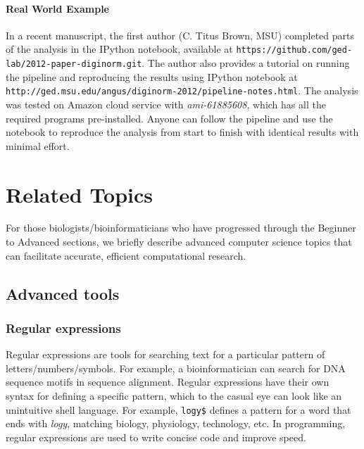 \documentclass[ChapterTOCs,krantz2]{krantz} %
\begin{document}
\paragraph{Real World Example}

In a recent manuscript, the first author (C. Titus Brown, MSU) completed parts
of the analysis in the IPython notebook, available at
\texttt{https://github.com/ged-lab/2012-paper-diginorm.git}. The author also
provides a tutorial on running the pipeline and reproducing the
results using IPython notebook at
\texttt{http://ged.msu.edu/angus/diginorm-2012/pipeline-notes.html}. 
The analysis was tested on Amazon cloud service with
\emph{ami-61885608}, which has all the required programs pre-installed. Anyone
can follow the pipeline and use the notebook to reproduce the
analysis from start to finish with identical results with minimal effort.

\section{Related Topics}

For those biologists/bioinformaticians who have progressed through the Beginner
to Advanced sections, we briefly describe advanced computer science topics 
that can facilitate accurate, efficient computational research.

\subsection{Advanced tools}




\subsubsection{Regular expressions}

Regular expressions are tools for
searching text for a particular pattern of letters/numbers/symbols.  For
example, a bioinformatician can search for DNA sequence motifs in sequence 
alignment.  Regular expressions have their own
syntax for defining a specific pattern, which to the casual eye can look like
an unintuitive shell language. For example, \texttt{logy\$} defines a pattern for a word
that ends with \emph{logy}, matching biology, physiology, technology, etc.
In programming, regular expressions are
used to write concise code and improve speed. 
\end{document}
